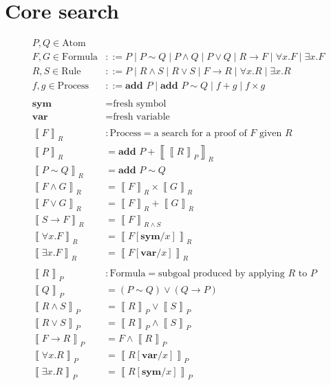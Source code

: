 \documentclass[10pt]{article}
\newcommand{\ox}[1]{\left\llbracket #1\right\rrbracket}
\newcommand{\subst}[3]{#1[#2/#3]}
\begin{document}
\section*{Core search}

\newcommand{\genvar}{\textbf{var}}
\newcommand{\gensym}{\textbf{sym}}
\newcommand{\assert}[1]{\textbf{add }#1}

\newcommand{\searchwith}[2]{{\ox{#2}}_{#1}}
\newcommand{\search}[1]{\searchwith{R}{#1}}
\newcommand{\ccrule}[1]{\ox{#1}_P}
 
\begin{align*}
  P, Q\in \textrm{Atom}& \\
  F, G\in\textrm{Formula} &::= P\mid P\sim Q\mid P\land Q\mid P\lor Q\mid R\to F
                          \mid \forall x. F\mid\exists x. F \\
  R, S\in\textrm{Rule} &::= P\mid R\land S\mid R\lor S
                       \mid F\to R\mid \forall x. R\mid \exists x. R \\
  f, g\in\textrm{Process} &::= \assert P\mid\assert P\sim Q
                          \mid f + g\mid f\times g\\
\\
\gensym &= \textrm{fresh symbol} \\
\genvar &= \textrm{fresh variable} \\
\\
\search F &: \textrm{Process} =\textrm{a search for a proof of }F\textrm{ given }R\\
\search{P} &= \assert P + \search{\ccrule R} \\
\search{P\sim Q} &= \assert P\sim Q \\
\search{F\land G} &= \search F\times\search G \\
\search{F\lor G} &= \search F + \search G \\
\search{S\to F} &= \searchwith{R\land S}{F}\\
\search{\forall x. F} &= \search{\subst F{\gensym}x} \\
\search{\exists x. F} &= \search{\subst F{\genvar}x} \\
\\
\ccrule{R} &:\textrm{Formula} = \textrm{subgoal produced by applying }R\textrm{ to }P \\
\ccrule Q &= (P\sim Q)\lor (Q\to P) \\
\ccrule{R\land S} &= \ccrule R\lor \ccrule S \\
\ccrule{R\lor S} &= \ccrule R\land \ccrule S \\
\ccrule{F\to R} &= F\land\ccrule{R} \\
\ccrule{\forall x. R} &= \ccrule{\subst R{\genvar}x} \\
\ccrule{\exists x. R} &= \ccrule{\subst R{\gensym}x} \\
\end{align*}
\end{document}
